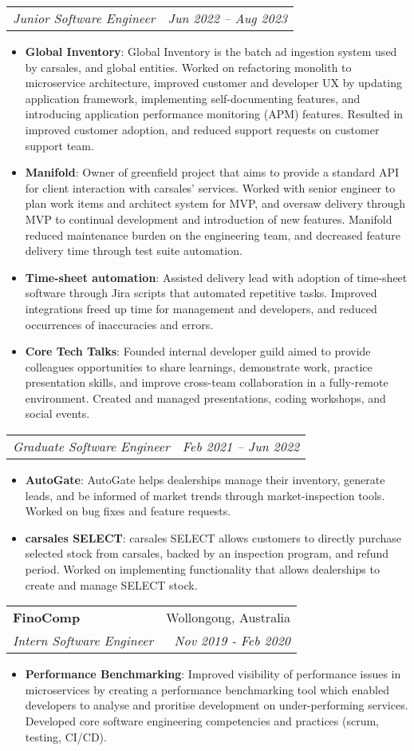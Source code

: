 \documentclass[letterpaper,11pt]{article}
\makeatletter
\newcommand{\resumeItem}[2]{
  \item\small{
    \textbf{#1}{: #2 \vspace{-2pt}}
  }
}
\newcommand{\resumeSubheading}[4]{
  \vspace{-1pt}\item
    \begin{tabular*}{0.97\textwidth}[t]{l@{\extracolsep{\fill}}r}
      \textbf{#1} & #2 \\
      \textit{\small#3} & \textit{\small #4} \\
    \end{tabular*}\vspace{-5pt}
}
\newcommand{\resumeSubSubheading}[2]{
    \begin{tabular*}{0.97\textwidth}{l@{\extracolsep{\fill}}r}
      \textit{\small#1} & \textit{\small #2} \\
    \end{tabular*}\vspace{-5pt}
}
\newcommand{\resumeItemListStart}{\begin{itemize}}
\newcommand{\resumeItemListEnd}{\end{itemize}\vspace{-5pt}}
\makeatother
\begin{document}
   \resumeSubSubheading
    {Junior Software Engineer}{Jun 2022 -- Aug 2023}
    \resumeItemListStart
       \resumeItem{Global Inventory}
         {Global Inventory is the batch ad ingestion system used by carsales, and global entities. Worked on refactoring monolith to microservice architecture, improved customer and developer UX by updating application framework, implementing self-documenting features, and introducing application performance monitoring (APM) features. Resulted in improved customer adoption, and reduced support requests on customer support team.}
       \resumeItem{Manifold}
         {Owner of greenfield project that aims to provide a standard API for client interaction with carsales’ services. Worked with senior engineer to plan work items and architect system for MVP, and oversaw delivery through MVP to continual development and introduction of new features. Manifold reduced maintenance burden on the engineering team, and decreased feature delivery time through test suite automation.}
       \resumeItem{Time-sheet automation}
         {Assisted delivery lead with adoption of time-sheet software through Jira scripts that automated repetitive tasks. Improved integrations freed up time for management and developers, and reduced occurrences of inaccuracies and errors.}
       \resumeItem{Core Tech Talks}
         {Founded internal developer guild aimed to provide colleagues opportunities to share learnings, demonstrate work, practice presentation skills, and improve cross-team collaboration in a fully-remote environment. Created and managed presentations, coding workshops, and social events.}
    \resumeItemListEnd

   \resumeSubSubheading
    {Graduate Software Engineer}{Feb 2021 -- Jun 2022}
    \resumeItemListStart
       \resumeItem{AutoGate}
         {AutoGate helps dealerships manage their inventory, generate leads, and be informed of market trends through market-inspection tools. Worked on bug fixes and feature requests.}
       \resumeItem{carsales SELECT}
         {carsales SELECT allows customers to directly purchase selected stock from carsales, backed by an inspection program, and refund period. Worked on implementing functionality that allows dealerships to create and manage SELECT stock.}
    \resumeItemListEnd


    \resumeSubheading
      {FinoComp}{Wollongong, Australia}
      {Intern Software Engineer}{Nov 2019 - Feb 2020}
      \resumeItemListStart
        \resumeItem{Performance Benchmarking}
          {Improved visibility of performance issues in microservices by creating a performance benchmarking tool which enabled developers to analyse and proritise development on under-performing services. Developed core software engineering competencies and practices (scrum, testing, CI/CD).}
      \resumeItemListEnd
\end{document}
